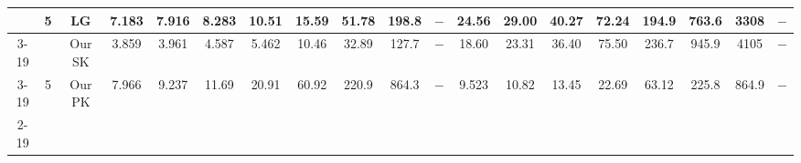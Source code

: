 \begin{table}[]
{\begin{tabular}{|c|c|c|cccccccccccccccc|}
& \multirow{3}{*}{5}  & LG & \multicolumn{1}{c|}{7.183} & \multicolumn{1}{c|}{7.916} & \multicolumn{1}{c|}{8.283} & \multicolumn{1}{c|}{10.51} & \multicolumn{1}{c|}{15.59} & \multicolumn{1}{c|}{51.78} & \multicolumn{1}{c|}{198.8} & \multicolumn{1}{c|}{$-$} & \multicolumn{1}{c|}{24.56} & \multicolumn{1}{c|}{29.00} & \multicolumn{1}{c|}{40.27} & \multicolumn{1}{c|}{72.24} & \multicolumn{1}{c|}{194.9} & \multicolumn{1}{c|}{763.6} & \multicolumn{1}{c|}{3308} & $-$ \\ \cline{3-19} 
 &  & Our SK & \multicolumn{1}{c|}{\cellcolor{blue!30}3.859} & \multicolumn{1}{c|}{\cellcolor{blue!30}3.961} & \multicolumn{1}{c|}{\cellcolor{blue!30}4.587} & \multicolumn{1}{c|}{\cellcolor{blue!30}5.462} & \multicolumn{1}{c|}{\cellcolor{blue!30}10.46} & \multicolumn{1}{c|}{\cellcolor{blue!30}32.89} & \multicolumn{1}{c|}{\cellcolor{blue!30}127.7} & \multicolumn{1}{c|}{$-$} & \multicolumn{1}{c|}{18.60} & \multicolumn{1}{c|}{23.31} & \multicolumn{1}{c|}{36.40} & \multicolumn{1}{c|}{75.50} & \multicolumn{1}{c|}{236.7} & \multicolumn{1}{c|}{945.9} & \multicolumn{1}{c|}{4105} & $-$ \\ \cline{3-19} 
 & \multirow{-3}{*}{5} & Our PK & \multicolumn{1}{c|}{7.966} & \multicolumn{1}{c|}{9.237} & \multicolumn{1}{c|}{11.69} & \multicolumn{1}{c|}{20.91} & \multicolumn{1}{c|}{60.92} & \multicolumn{1}{c|}{220.9} & \multicolumn{1}{c|}{864.3} & \multicolumn{1}{c|}{$-$} & \multicolumn{1}{c|}{\cellcolor{blue!30}9.523} & \multicolumn{1}{c|}{\cellcolor{blue!30}10.82} & \multicolumn{1}{c|}{\cellcolor{blue!30}13.45} & \multicolumn{1}{c|}{\cellcolor{blue!30}22.69} & \multicolumn{1}{c|}{\cellcolor{blue!30}63.12} & \multicolumn{1}{c|}{\cellcolor{blue!30}225.8} & \multicolumn{1}{c|}{\cellcolor{blue!30}864.9} & $-$ \\ \cline{2-19} 


\end{tabular}}
\end{table}
